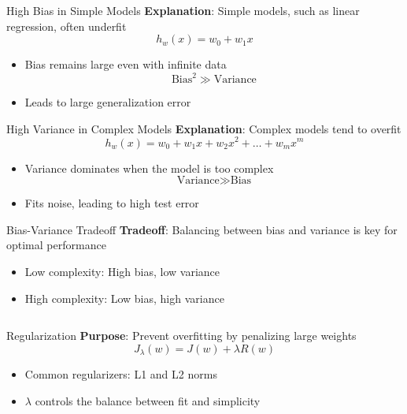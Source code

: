 \documentclass[serif, aspectratio=169]{beamer}
\begin{document}
\begin{frame}{High Bias in Simple Models}
    \textbf{Explanation}: Simple models, such as linear regression, often underfit
    \[
    h_w(x) = w_0 + w_1 x
    \]
    \begin{itemize}
        \item Bias remains large even with infinite data
        \[
        \text{Bias}^2 \gg \text{Variance}
        \]
        \item Leads to large generalization error
    \end{itemize}
\end{frame}

\begin{frame}{High Variance in Complex Models}
    \textbf{Explanation}: Complex models tend to overfit
    \[
    h_w(x) = w_0 + w_1 x + w_2 x^2 + \dots + w_m x^m
    \]
    \begin{itemize}
        \item Variance dominates when the model is too complex
        \[
        \text{Variance} \gg \text{Bias}
        \]
        \item Fits noise, leading to high test error
    \end{itemize}
\end{frame}

\begin{frame}{Bias-Variance Tradeoff}
    \textbf{Tradeoff}: Balancing between bias and variance is key for optimal performance
    \begin{itemize}
        \item Low complexity: High bias, low variance
        \item High complexity: Low bias, high variance
    \end{itemize}
    \[
    \]
\end{frame}

\begin{frame}{Regularization}
    \textbf{Purpose}: Prevent overfitting by penalizing large weights
    \[
    J_{\lambda}(w) = J(w) + \lambda R(w)
    \]
    \begin{itemize}
        \item Common regularizers: L1 and L2 norms
        \item \( \lambda \) controls the balance between fit and simplicity
    \end{itemize}
\end{frame}
\end{document}
